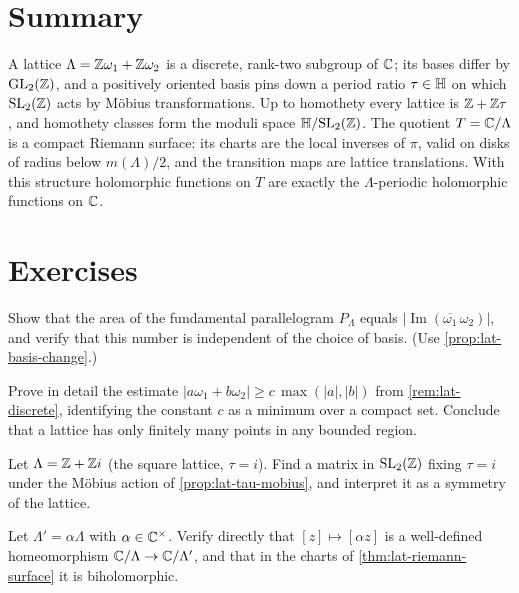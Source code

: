 \section{Summary}
\label{sec:lat-summary}

A lattice \(\Lambda = \mathbb{Z}\omega_1 + \mathbb{Z}\omega_2\) is a discrete, rank-two subgroup
of \(\mathbb{C}\); its bases differ by \(\mathrm{GL}_2(\mathbb{Z})\), and a positively oriented
basis pins down a period ratio \(\tau \in \mathbb{H}\) on which \(\mathrm{SL}_2(\mathbb{Z})\)
acts by M\"obius transformations. Up to homothety every lattice is
\(\mathbb{Z} + \mathbb{Z}\tau\), and homothety classes form the moduli space
\(\mathbb{H}/\mathrm{SL}_2(\mathbb{Z})\). The quotient \(T = \mathbb{C}/\Lambda\) is a compact Riemann
surface: its charts are the local inverses of \(\pi\), valid on disks of radius
below \(m(\Lambda)/2\), and the transition maps are lattice translations. With
this structure holomorphic functions on \(T\) are exactly the
\(\Lambda\)-periodic holomorphic functions on \(\mathbb{C}\).

\section*{Exercises}

\begin{exercise}
\label{ex:lat-area}
Show that the area of the fundamental parallelogram \(P_\Lambda\) equals
\(|\operatorname{Im}(\overline{\omega_1}\,\omega_2)|\), and verify that this
number is independent of the choice of basis. (Use
\cref{prop:lat-basis-change}.)
\end{exercise}

\begin{exercise}
\label{ex:lat-discrete}
Prove in detail the estimate \(|a\omega_1 + b\omega_2| \ge c\,\max(|a|,|b|)\)
from \cref{rem:lat-discrete}, identifying the constant \(c\) as a minimum over a
compact set. Conclude that a lattice has only finitely many points in any
bounded region.
\end{exercise}

\begin{exercise}
\label{ex:lat-square}
Let \(\Lambda = \mathbb{Z} + \mathbb{Z} i\) (the square lattice, \(\tau = i\)). Find a matrix in
\(\mathrm{SL}_2(\mathbb{Z})\) fixing \(\tau = i\) under the M\"obius action of
\cref{prop:lat-tau-mobius}, and interpret it as a symmetry of the lattice.
\end{exercise}

\begin{exercise}
\label{ex:lat-homothety-iso}
Let \(\Lambda' = \alpha\Lambda\) with \(\alpha \in \mathbb{C}^\times\). Verify directly
that \([z] \mapsto [\alpha z]\) is a well-defined homeomorphism
\(\mathbb{C}/\Lambda \to \mathbb{C}/\Lambda'\), and that in the charts of
\cref{thm:lat-riemann-surface} it is biholomorphic.
\end{exercise}

